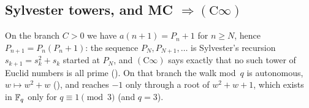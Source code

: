 \documentclass[10pt,a4paper]{article}
\newcommand{\Cinf}{(\mathrm{C}\infty)}
\begin{document}
\subsection{Sylvester towers, and MC $\Rightarrow\Cinf$}

On the branch $C>0$ we have $a(n{+}1)=P_n+1$ for $n\ge N$, hence
$P_{n+1}=P_n(P_n+1)$: the sequence $P_N,P_{N+1},\dots$ is Sylvester's
recursion $s_{k+1}=s_k^2+s_k$ started at $P_N$, and $\Cinf$ says exactly
that no such tower of Euclid numbers is all prime
().
On that branch the walk mod~$q$ is autonomous, $w\mapsto w^2+w$
(),
and reaches $-1$ only through a root of $w^2+w+1$, which exists in $\mathbb{F}_q$
only for $q\equiv1\pmod3$ (and $q=3$).
\end{document}
